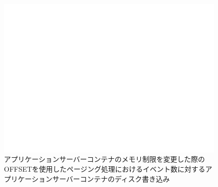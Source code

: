\documentclass[../../../../../main]{subfiles}
\begin{document}
    \begin{figure}[H]
        \centering
        \includegraphics[width=12cm]{graph}
        \caption{アプリケーションサーバーコンテナのメモリ制限を変更した際のOFFSETを使用したページング処理におけるイベント数に対するアプリケーションサーバーコンテナのディスク書き込み}
        \label{fig:paging-offset-change-app-memory-limit-app-disk-in-app_1024-db_1_1024}
    \end{figure}
\end{document}
